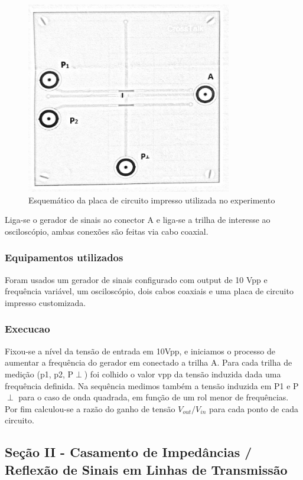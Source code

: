 \documentclass[12pt]{article}
\begin{document}
\begin{figure}[H]
  \centering
  \includegraphics[width=0.8\textwidth]{img/pcb-esquema.png}
  \caption{Esquemático da placa de circuito impresso utilizada no experimento}
  \label{fig:img/pcb-esquema.png}
\end{figure}

Liga-se o gerador de sinais ao conector A e liga-se a trilha de
interesse ao osciloscópio, ambas conexões são feitas via cabo coaxial.

\subsubsection{Equipamentos utilizados}
Foram usados um gerador de sinais configurado com output de 10 Vpp e
frequência variável, um osciloscópio, dois cabos coaxiais e uma placa
de circuito impresso customizada.

\subsubsection{Execucao}
Fixou-se a nível da tensão de entrada em 10Vpp, e iniciamos o
processo de aumentar a frequência do gerador em conectado a trilha A.
Para cada trilha de medição (p1, p2, P$\perp$) foi colhido o valor
vpp da tensão induzida dada uma frequência definida.
Na sequência medimos também a tensão induzida em P1 e P$\perp$ para o
caso de onda quadrada, em função de um rol menor de frequências.
Por fim calculou-se a razão do ganho de tensão ${V_{out}}/{V_{in}}$ para
cada ponto de cada circuito.

\subsection{Seção II - Casamento de Impedâncias / Reflexão de Sinais
em Linhas de Transmissão}
\end{document}
